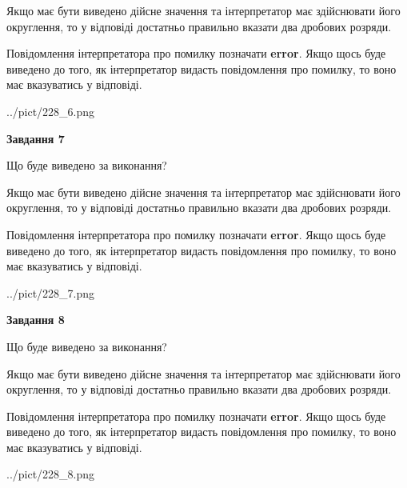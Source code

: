 \documentclass[12pt, ukrainian]{article}
\begin{document}
{\begin {Large}
Якщо має бути виведено дійсне значення та інтерпретатор має здійснювати його округлення, 
то у відповіді достатньо правильно вказати два дробових розряди.

Повідомлення інтерпретатора про помилку позначати \textbf{error}.
Якщо щось буде виведено до того, як інтерпретатор видасть повідомлення про помилку, 
то воно має вказуватись у відповіді. \par

\begin{center}
	{../pict/228_6.png}
\end{center}
\newpage

{\begin {center}\textbf{Завдання 7}\end {center}}\par
Що буде виведено за виконання? \par

Якщо має бути виведено дійсне значення та інтерпретатор має здійснювати його округлення, 
то у відповіді достатньо правильно вказати два дробових розряди.

Повідомлення інтерпретатора про помилку позначати \textbf{error}.
Якщо щось буде виведено до того, як інтерпретатор видасть повідомлення про помилку, 
то воно має вказуватись у відповіді. \par

\begin{center}
	{../pict/228_7.png}
\end{center}
\newpage

{\begin {center}\textbf{Завдання 8}\end {center}}\par
Що буде виведено за виконання? \par

Якщо має бути виведено дійсне значення та інтерпретатор має здійснювати його округлення, 
то у відповіді достатньо правильно вказати два дробових розряди.

Повідомлення інтерпретатора про помилку позначати \textbf{error}.
Якщо щось буде виведено до того, як інтерпретатор видасть повідомлення про помилку, 
то воно має вказуватись у відповіді. \par

\begin{center}
	{../pict/228_8.png}
\end{center}
\newpage


\end{Large}}
\end{document}

